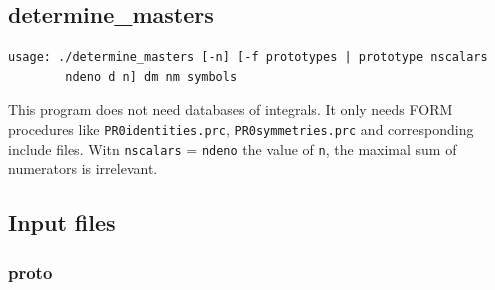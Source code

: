 \documentclass[a4paper,11pt]{article}
\begin{document}
\subsection{determine\_masters}

\begin{verbatim}
usage: ./determine_masters [-n] [-f prototypes | prototype nscalars 
        ndeno d n] dm nm symbols
\end{verbatim}


This program does not need databases of integrals. It only needs FORM procedures
like 
\verb+PR0identities.prc+, \verb+PR0symmetries.prc+ and corresponding include
files. Witn \verb+nscalars+ = \verb+ndeno+ the value of \verb+n+, the maximal sum of
numerators is irrelevant.



\subsection{Input files}

\subsubsection*{proto}
\end{document}
